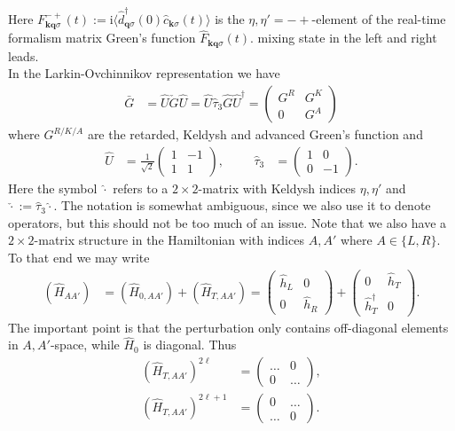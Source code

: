 \documentclass[english, parskip=full]{scrartcl}
\renewcommand{\bra}{}
\newcommand{\kla}{}
\renewcommand{\i}{\text{i}}
\begin{document}
Here $F_{\textbf{k}\textbf{q}\sigma}^{-+}(t) := \i \bra\langle \hat{d}_{\textbf{q}\sigma}^\dagger (0) \hat{c}_{\textbf{k}\sigma}(t) \rangle$ is the $\eta,\eta' = -+$-element of the real-time formalism matrix Green's function $\hat{F}_{\textbf{k}\textbf{q}\sigma}(t)$. mixing state in the left and right leads.\\
In the Larkin-Ovchinnikov representation we have
\begin{align}
\bar{G} &= \hat{U} \check{G} \hat{U} = \hat{U} \hat{\tau}_3 \hat{G} \hat{U}^\dagger = \begin{pmatrix}
G^R & G^K \\ 0 & G^A
\end{pmatrix}
\end{align}
where $G^{R/K/A}$ are the retarded, Keldysh and advanced Green's function and
\begin{align}
\hat{U} &= \frac{1}{\sqrt{2}} \begin{pmatrix}
1 & -1 \\ 1 & 1
\end{pmatrix}, &&& \hat{\tau}_3 &= \begin{pmatrix}
1 & 0 \\ 0 & -1
\end{pmatrix}.
\end{align}
Here the symbol $\hat{\cdot}$ refers to a $2\times 2$-matrix with Keldysh indices $\eta,\eta'$ and $\check{\cdot} := \hat{\tau}_3 \hat{\cdot}$.
The notation is somewhat ambiguous, since we also use it to denote operators, but this should not be too much of an issue.
Note that we also have a $2\times 2$-matrix structure in the Hamiltonian with indices $A,A'$ where $A\in\{L,R\}$.
To that end we may write
\begin{align}
\kla\left( \hat{H}_{AA'} \right) &= \kla\left( \hat{H}_{0,AA'} \right) + \kla\left( \hat{H}_{T,AA'} \right) =  \begin{pmatrix}
\hat{h}_L & 0 \\ 0 & \hat{h}_R
\end{pmatrix} + \begin{pmatrix}
0 & \hat{h}_T \\ \hat{h}_T^\dagger & 0
\end{pmatrix}.
\end{align}
The important point is that the perturbation only contains off-diagonal elements in $A,A'$-space, while $\hat{H}_0$ is diagonal.
Thus 
\begin{align}
\kla\left( \hat{H}_{T,AA'} \right)^{2\ell} &= \begin{pmatrix}
\dots & 0 \\ 0 & \dots
\end{pmatrix},\\
\kla\left( \hat{H}_{T,AA'} \right)^{2\ell + 1} &= \begin{pmatrix}
0 & \dots \\ \dots & 0
\end{pmatrix}.
\end{align}
\end{document}
